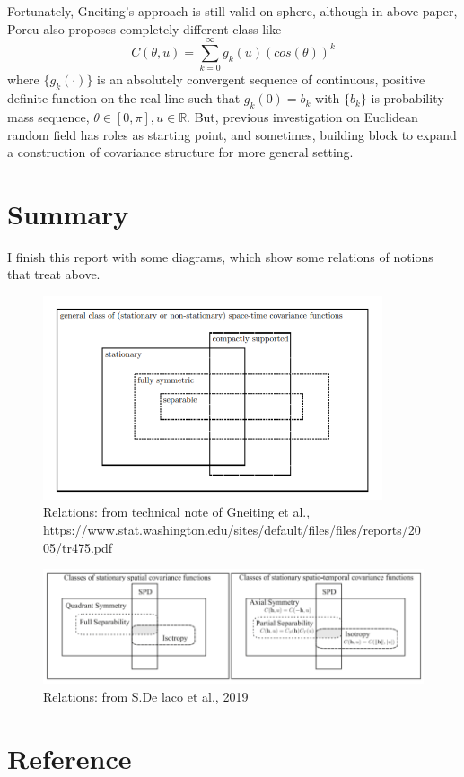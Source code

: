 \documentclass{article}
\begin{document}
{Fortunately, Gneiting's approach is still valid on sphere,
although in above paper, Porcu also proposes completely different class like
\[C(\theta,u)=\sum_{k=0}^\infty g_k(u)(cos(\theta))^k\]
where $\{g_k(\cdot)\}$ is an absolutely convergent sequence of continuous, positive definite function on the real line
such that $g_k(0)=b_k$ with $\{b_k\}$ is probability mass sequence, $\theta\in[0,\pi], u\in\mathbb R$.
But, previous investigation on Euclidean random field has roles as starting point, and sometimes, building block 
to expand a construction of covariance structure for more general setting.


\section{Summary}
I finish this report with some diagrams, which show some relations of notions that treat above.
\begin{figure}[h]
    \centering
    \includegraphics[width=10cm]{Gneiting.png}
    \caption{Relations: from technical note of Gneiting et al., \\ https://www.stat.washington.edu/sites/default/files/files/reports/2005/tr475.pdf}
\end{figure}
\begin{figure}[h]
    \centering
    \includegraphics[width=16cm]{de_Laco.png}
    \caption{Relations: from S.De laco et al., 2019}
\end{figure}

\section{Reference}

}
\end{document}
